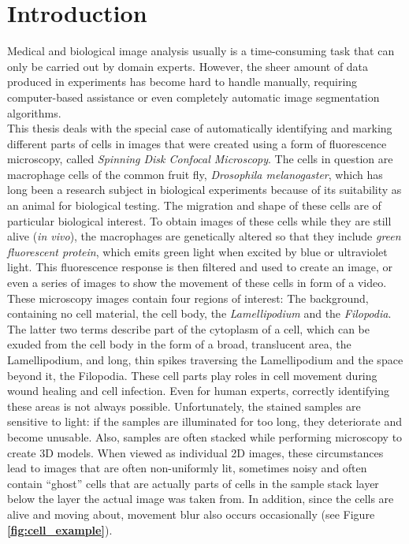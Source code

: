 \chapter{Introduction}
Medical and biological image analysis usually is a time-consuming task that can only be carried out by domain experts. However, the sheer amount of data produced in experiments has become hard to handle manually, requiring computer-based assistance or even completely automatic image segmentation algorithms.\\

\noindent This thesis deals with the special case of automatically identifying and marking different parts of cells in images that were created using a form of fluorescence microscopy, called \textit{Spinning Disk Confocal Microscopy}. The cells in question are macrophage cells of the common fruit fly, \textit{Drosophila melanogaster}, which has long been a research subject in biological experiments because of its suitability as an animal for biological testing. The migration and shape of these cells are of particular biological interest. To obtain images of these cells while they are still alive (\textit{in vivo}), the macrophages are genetically altered so that they include \textit{green fluorescent protein}, which emits green light when excited by blue or ultraviolet light. This fluorescence response is then filtered and used to create an image, or even a series of images to show the movement of these cells in form of a video. These microscopy images contain four regions of interest: The background, containing no cell material, the cell body, the \textit{Lamellipodium} and the \textit{Filopodia}. The latter two terms describe part of the cytoplasm of a cell, which can be exuded from the cell body in the form of a broad, translucent area, the Lamellipodium, and long, thin spikes traversing the Lamellipodium and the space beyond it, the Filopodia. These cell parts play roles in cell movement during wound healing and cell infection. Even for human experts, correctly identifying these areas is not always possible. Unfortunately, the stained samples are sensitive to light: if the samples are illuminated for too long, they deteriorate and become unusable. Also, samples are often stacked while performing microscopy to create 3D models. When viewed as individual 2D images, these circumstances lead to images that are often non-uniformly lit, sometimes noisy and often contain ``ghost'' cells that are actually parts of cells in the sample stack layer below the layer the actual image was taken from. In addition, since the cells are alive and moving about, movement blur also occurs occasionally (see Figure \textbf{\ref{fig:cell_example}}). \cite{bioimage, bioimage2}

